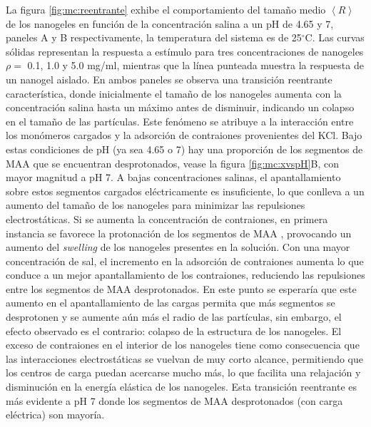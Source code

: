 	La figura \ref{fig:mc:reentrante} exhibe el comportamiento del tama\~no medio $\left<R\right>$ de los nanogeles en funci\'on de la concentraci\'on salina a un pH de 4.65 y 7, paneles A y B respectivamente, la temperatura del sistema es de 25$^\circ$C. Las curvas s\'olidas representan la respuesta a est\'imulo para tres concentraciones de nanogeles $\rho =$ 0.1, 1.0 y 5.0 mg/ml, mientras que la l\'inea punteada muestra la respuesta de un nanogel aislado. En ambos paneles se observa una transici\'on reentrante caracter\'istica, donde inicialmente el tama\~no de los nanogeles aumenta con la concentraci\'on salina hasta un m\'aximo antes de disminuir, indicando un colapso en el tama\~no de las part\'iculas. Este fen\'omeno se atribuye a la interacci\'on entre los mon\'omeros cargados y la adsorci\'on de contraiones provenientes del KCl. Bajo estas condiciones de pH (ya sea 4.65 o 7) hay una proporci\'on de los segmentos de MAA que se encuentran desprotonados, vease la figura \ref{fig:mc:xvspH}B, con mayor magnitud a pH 7. A bajas concentraciones salinas, el apantallamiento sobre estos segmentos cargados el\'ectricamente es insuficiente, lo que conlleva a un aumento del tama\~no de los nanogeles para minimizar las repulsiones electrost\'aticas. Si se aumenta la concentraci\'on de contraiones, en primera instancia se favorece la protonaci\'on de los segmentos de MAA \cite{perez2021thermodynamic}, provocando un aumento del \textit{swelling} de los nanogeles presentes en la soluci\'on. Con una mayor concentraci\'on de sal, el incremento en la adsorci\'on de contraiones aumenta lo que conduce a un mejor apantallamiento de los contraiones, reduciendo las repulsiones entre los segmentos de MAA desprotonados. En este punto se esperar\'ia que este aumento en el apantallamiento de las cargas permita que m\'as segmentos se desprotonen y se aumente a\'un m\'as el radio de las part\'iculas, sin embargo, el efecto observado es el contrario: colapso de la estructura de los nanogeles. El exceso de contraiones en el interior de los nanogeles tiene como consecuencia que las interacciones electrost\'aticas se vuelvan de muy corto alcance, permitiendo que los centros de carga puedan acercarse mucho m\'as, lo que facilita una relajaci\'on y disminuci\'on en la energ\'ia el\'astica de los nanogeles. Esta transici\'on reentrante es m\'as evidente a pH 7 donde los segmentos de MAA desprotonados (con carga el\'ectrica) son mayor\'ia.
	
